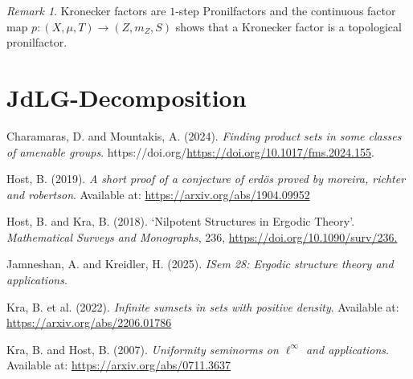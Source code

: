 \documentclass[
  british,
]{article}
\newlength{\cslhangindent}
\newenvironment{CSLReferences}[2] %
 {\begin{list}{}{%
  \setlength{\itemindent}{0pt}
  \setlength{\leftmargin}{0pt}
  \setlength{\parsep}{0pt}
  \ifodd #1
   \setlength{\leftmargin}{\cslhangindent}
   \setlength{\itemindent}{-1\cslhangindent}
  \fi
  \setlength{\itemsep}{#2\baselineskip}}}
 {\end{list}}
\theoremstyle{plain}
\theoremstyle{definition}
\theoremstyle{plain}
\theoremstyle{remark}
\newtheorem{refremark}{Remark}[section]
\newcommand{\KroneckerFactorMap}{p}
\newcommand{\KroneckerMeasure}{{m_Z}}
\newcommand{\KroneckerSpace}{{Z}}
\newcommand{\Measure}{{\mu}}
\newcommand{\ShiftSpace}{{X}}
\newcommand{\FurstenbergSystem}{(\ShiftSpace,\Measure,T)}
\newcommand{\KroneckerFactor}{{(\KroneckerSpace,\KroneckerMeasure,S)}}
\begin{document}
\begin{refremark}
Kronecker factors are \(1\)-step Pronilfactors and the continuous factor
map
\(\KroneckerFactorMap: \FurstenbergSystem\rightarrow\KroneckerFactor\)
shows that a Kronecker factor is a topological pronilfactor.

\label{rem-Kronecker}

\end{refremark}

\section{JdLG-Decomposition}\label{jdlg-decomposition}

\protect{}\label{refs}
\begin{CSLReferences}{1}{0}
Charamaras, D. and Mountakis, A. (2024). \emph{Finding product sets in
some classes of amenable groups}.
https://doi.org/\url{https://doi.org/10.1017/fms.2024.155}.

Host, B. (2019). \emph{A short proof of a conjecture of erdös proved by
moreira, richter and robertson}. Available at:
\url{https://arxiv.org/abs/1904.09952}

Host, B. and Kra, B. (2018). `{Nilpotent Structures in Ergodic Theory}'.
\emph{Mathematical Surveys and Monographs}, 236,
\href{https://doi.org/10.1090/surv/236}{https://doi.org/10.1090/surv/236.}

Jamneshan, A. and Kreidler, H. (2025). \emph{ISem 28: Ergodic structure
theory and applications}.

Kra, B. et al. (2022). \emph{Infinite sumsets in sets with positive
density}. Available at: \url{https://arxiv.org/abs/2206.01786}

Kra, B. and Host, B. (2007). \emph{Uniformity seminorms on
\(\ell^\infty\) and applications}. Available at:
\url{https://arxiv.org/abs/0711.3637}

\end{CSLReferences}
\end{document}
